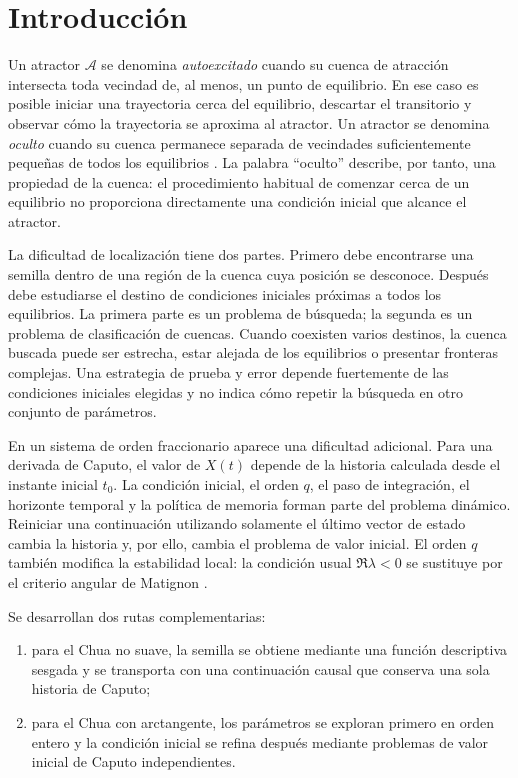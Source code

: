 \section{Introducción}
\label{sec:introduccion}

Un atractor \(\mathcal A\) se denomina \emph{autoexcitado} cuando su cuenca de
atracción intersecta toda vecindad de, al menos, un punto de equilibrio. En ese
caso es posible iniciar una trayectoria cerca del equilibrio, descartar el
transitorio y observar cómo la trayectoria se aproxima al atractor. Un
atractor se denomina \emph{oculto} cuando su cuenca permanece separada de
vecindades suficientemente pequeñas de todos los equilibrios
\cite{LeonovKuznetsov2013,KuznetsovEtAl2017}. La palabra ``oculto'' describe,
por tanto, una propiedad de la cuenca: el procedimiento habitual de comenzar
cerca de un equilibrio no proporciona directamente una condición inicial que
alcance el atractor.

La dificultad de localización tiene dos partes. Primero debe encontrarse una
semilla dentro de una región de la cuenca cuya posición se desconoce. Después
debe estudiarse el destino de condiciones iniciales próximas a todos los
equilibrios. La primera parte es un problema de búsqueda; la segunda es un
problema de clasificación de cuencas. Cuando coexisten varios destinos, la
cuenca buscada puede ser estrecha, estar alejada de los equilibrios o presentar
fronteras complejas. Una estrategia de prueba y error depende fuertemente de
las condiciones iniciales elegidas y no indica cómo repetir la búsqueda en
otro conjunto de parámetros.

En un sistema de orden fraccionario aparece una dificultad adicional. Para una
derivada de Caputo, el valor de \(X(t)\) depende de la historia calculada desde
el instante inicial \(t_0\). La condición inicial, el orden \(q\), el paso de
integración, el horizonte temporal y la política de memoria forman parte del
problema dinámico. Reiniciar una continuación utilizando solamente el último
vector de estado cambia la historia y, por ello, cambia el problema de valor
inicial. El orden \(q\) también modifica la estabilidad local: la condición
usual \(\Re\lambda<0\) se sustituye por el criterio angular de Matignon
\cite{Matignon1996}.

Se desarrollan dos rutas complementarias:

\begin{enumerate}
  \item para el Chua no suave, la semilla se obtiene mediante una función
  descriptiva sesgada y se transporta con una continuación causal que conserva
  una sola historia de Caputo;
  \item para el Chua con arctangente, los parámetros se exploran primero en
  orden entero y la condición inicial se refina después mediante problemas de
  valor inicial de Caputo independientes.
\end{enumerate}

